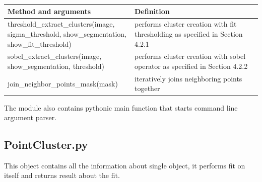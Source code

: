 \documentclass[12pt, a4paper, oneside]{book}
\begin{document}
\begin{center}
    \begin{tabular}  { | p{0.5\linewidth} | p{0.5\linewidth} | }
        \hline
        Method and arguments & Definition \\
        \hline
        threshold\_extract\_clusters(image, sigma\_threshold, show\_segmentation, show\_fit\_threshold) & performs cluster creation with fit thresholding as specified in Section 4.2.1 \\
        \hline
        sobel\_extract\_clusters(image, show\_segmentation, threshold) & performs cluster creation with sobel operator as specified in Section 4.2.2 \\
        \hline
        join\_neighbor\_points\_mask(mask) & iteratively joins neighboring points together \\
        \hline
    \end{tabular}
\end{center}

The module also contains pythonic main function that starts command line argument parser.

\subsection{PointCluster.py}

This object contains all the information about single object, it performs fit on itself and returns result about the fit.
\end{document}
